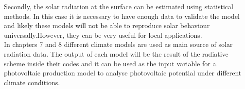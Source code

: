 Secondly, the solar radiation at the surface can be estimated using statistical methods. In this case it is necessary to have enough data to validate the model and likely these models will not be able to reproduce solar behaviour universally.However, they can be very useful for local applications.\\

In chapters 7 and 8 different climate models are used as main source of solar radiation data. The output of each model will be the result of the radiative scheme inside their codes and it can be used as the input variable for a photovoltaic production model to analyse photovoltaic potential under different climate conditions.



